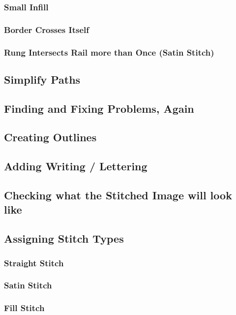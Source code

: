 \documentclass{article}
\begin{document}
            \subsubsection{Small Infill}
            \subsubsection{Border Crosses Itself}
            \subsubsection{Rung Intersects Rail more than Once (Satin Stitch)}

        \subsection{Simplify Paths}
        
        \subsection{Finding and Fixing Problems, Again}

        \subsection{Creating Outlines}
        
        \subsection{Adding Writing / Lettering}

        \subsection{Checking what the Stitched Image will look like}
        
        \subsection{Assigning Stitch Types}
            \subsubsection{Straight Stitch}
            \subsubsection{Satin Stitch}
            \subsubsection{Fill Stitch}
        
\end{document}
